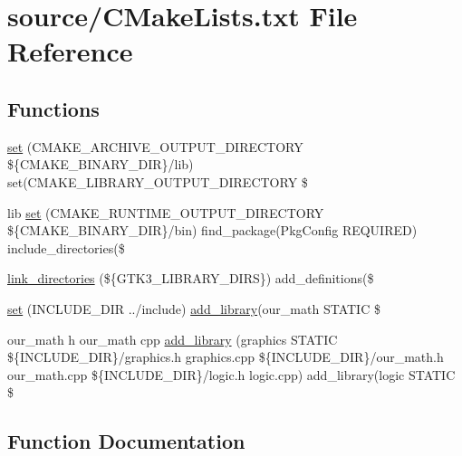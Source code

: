 \hypertarget{_c_make_lists_8txt}{}\section{source/\+C\+Make\+Lists.txt File Reference}
\label{_c_make_lists_8txt}
\subsection*{Functions}
\begin{DoxyCompactItemize}
\item 
\mbox{\hyperlink{_c_make_lists_8txt_aa8cfa969e56529289f44914bfc6dcea5}{set}} (C\+M\+A\+K\+E\+\_\+\+A\+R\+C\+H\+I\+V\+E\+\_\+\+O\+U\+T\+P\+U\+T\+\_\+\+D\+I\+R\+E\+C\+T\+O\+RY \$\{C\+M\+A\+K\+E\+\_\+\+B\+I\+N\+A\+R\+Y\+\_\+\+D\+IR\}/lib) set(C\+M\+A\+K\+E\+\_\+\+L\+I\+B\+R\+A\+R\+Y\+\_\+\+O\+U\+T\+P\+U\+T\+\_\+\+D\+I\+R\+E\+C\+T\+O\+RY \$
\item 
lib \mbox{\hyperlink{_c_make_lists_8txt_aa6040047f31ba73f9412cd532e415e14}{set}} (C\+M\+A\+K\+E\+\_\+\+R\+U\+N\+T\+I\+M\+E\+\_\+\+O\+U\+T\+P\+U\+T\+\_\+\+D\+I\+R\+E\+C\+T\+O\+RY \$\{C\+M\+A\+K\+E\+\_\+\+B\+I\+N\+A\+R\+Y\+\_\+\+D\+IR\}/bin) find\+\_\+package(Pkg\+Config R\+E\+Q\+U\+I\+R\+ED) include\+\_\+directories(\$
\item 
\mbox{\hyperlink{_c_make_lists_8txt_a265f0dc1a6bc8569b86539953fc9b882}{link\+\_\+directories}} (\$\{G\+T\+K3\+\_\+\+L\+I\+B\+R\+A\+R\+Y\+\_\+\+D\+I\+RS\}) add\+\_\+definitions(\$
\item 
\mbox{\hyperlink{_c_make_lists_8txt_a8a82efae20b933307c754835cbab0e55}{set}} (I\+N\+C\+L\+U\+D\+E\+\_\+\+D\+IR ../include) \mbox{\hyperlink{_c_make_lists_8txt_a83a3369e0048c89d8f6c5335713623ce}{add\+\_\+library}}(our\+\_\+math S\+T\+A\+T\+IC \$
\item 
our\+\_\+math h our\+\_\+math cpp \mbox{\hyperlink{_c_make_lists_8txt_a83a3369e0048c89d8f6c5335713623ce}{add\+\_\+library}} (graphics S\+T\+A\+T\+IC \$\{I\+N\+C\+L\+U\+D\+E\+\_\+\+D\+IR\}/graphics.\+h graphics.\+cpp \$\{I\+N\+C\+L\+U\+D\+E\+\_\+\+D\+IR\}/our\+\_\+math.\+h our\+\_\+math.\+cpp \$\{I\+N\+C\+L\+U\+D\+E\+\_\+\+D\+IR\}/logic.\+h logic.\+cpp) add\+\_\+library(logic S\+T\+A\+T\+IC \$
\end{DoxyCompactItemize}


\subsection{Function Documentation}
\mbox{\label{_c_make_lists_8txt_a83a3369e0048c89d8f6c5335713623ce}} 
